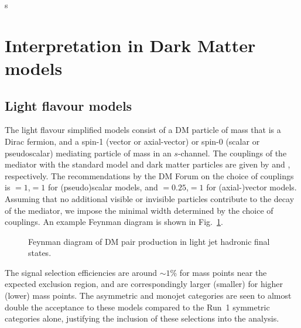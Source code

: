 s%
\section{Interpretation in Dark Matter models} \label{sec:darkmatter}



\subsection{Light flavour models} \label{sec:dm_lightjet}

The light flavour simplified models consist of a DM particle \pchi of mass
\mchi that is a Dirac fermion, and a spin-1 (vector or axial-vector) or spin-0
(scalar or pseudoscalar) mediating particle \pphi of mass \mphi in an
$s$-channel. The couplings of the mediator with the standard model and dark
matter particles are given by \gsm and \gdm, respectively. The recommendations
by the DM Forum on the choice of couplings is \gsm$=1$,\gdm$=1$ for
(pseudo)scalar models, and \gsm$=0.25$,\gdm$=1$ for (axial-)vector models.
Assuming that no additional visible or invisible particles contribute to the decay 
of the mediator, we impose the minimal width determined by the choice of couplings. 
An example Feynman diagram is shown in Fig.~\ref{fig:DMfeynman}.


\begin{figure}[h!] \centering
  \caption{Feynman diagram of DM pair production in light jet hadronic final states. \cite{Abercrombie:2015wmb}}
  \label{fig:DMfeynman} 
\end{figure}



The signal selection efficiencies are around $\sim 1$\% for mass points near the expected exclusion
region, and are correspondingly larger (smaller) for higher (lower) mass points.
The asymmetric and monojet categories are seen to almost double the acceptance
to these models compared to the Run~1 symmetric categories alone, justifying the
inclusion of these selections into the analysis.




